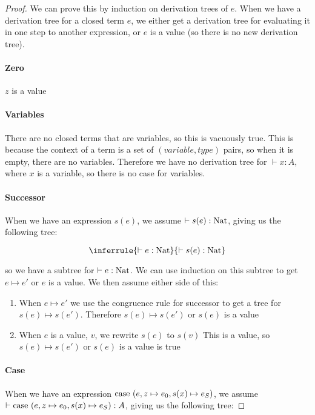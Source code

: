 \begin{proof}
We can prove this by induction on derivation trees of $e$. When we have a derivation tree for a closed term $e$, we either get a derivation tree for evaluating it in one step to another expression, or $e$ is a value (so there is no new derivation tree).  

\paragraph{Zero} $z$ is a value

\paragraph{Variables} There are no closed terms that are variables, so this is vacuously true. This is because the context of a term is a set of $(variable, type)$ pairs, so when it is empty, there are no variables. Therefore we have no derivation tree for $\vdash x : A$, where $x$ is a variable, so there is no case for variables.

\paragraph{Successor} When we have an expression $s(e)$, we assume $\vdash s(e) : \operatorname{Nat}$, giving us the following tree:

$$
\inferrule {\vdash e : \nat }
 {\vdash s(e) : \nat}
$$

so we have a subtree for $\vdash e : \operatorname{Nat}$. We can use induction on this subtree to get $e \mapsto e'$ or $e$ is a value. We then assume either side of this:

\begin{enumerate}
\item{When $e \mapsto e'$ we use the congruence rule for successor to get a tree for $s(e) \mapsto s(e')$. Therefore $s(e) \mapsto s(e')$ or $s(e)$ is a value}
\item{When $e$ is a value, $v$, we rewrite $s(e)$ to $s(v)$ This is a value, so $s(e) \mapsto s(e')$ or $s(e)$ is a value is true}
\end{enumerate}


\paragraph{Case} When we have an expression $\operatorname{case}  \ (e,z \mapsto e_0, s(x) \mapsto e_S)$, we assume $\vdash \operatorname{case}  \ (e,z \mapsto e_0, s(x) \mapsto e_S) :A$, giving us the following tree:


\end{proof}
